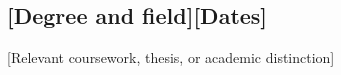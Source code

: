 \subsection{[Degree and field]\hfill [Dates]}
[Relevant coursework, thesis, or academic distinction]
